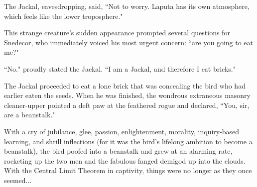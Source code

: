 \documentclass{article}
\begin{document}
The Jackal, eavesdropping, said, ``Not to worry. Laputa has its own atmosphere, which feels like the lower troposphere." \newline

This strange creature's sudden appearance prompted several questions for Snedecor, who immediately voiced his most urgent concern: ``are you going to eat me?" \newline

``No." proudly stated the Jackal. ``I am a Jackal, and therefore I eat bricks." \newline

The Jackal proceeded to eat a lone brick that was concealing the bird who had earlier eaten the seeds. When he was finished, the wondrous extraneous masonry cleaner-upper pointed a deft paw at the feathered rogue and declared, ``You, sir, are a beanstalk." \newline

With a cry of jubilance, glee, passion, enlightenment, morality, inquiry-based learning, and shrill inflections (for it was the bird's lifelong ambition to become a beanstalk), the bird poofed into a beanstalk and grew at an alarming rate, rocketing up the two men and the fabulous fanged demigod up into the clouds. With the Central Limit Theorem in captivity, things were no longer as they once seemed...


\end{document}
